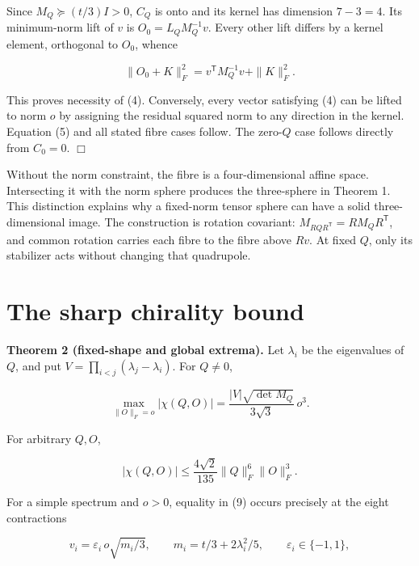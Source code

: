 \documentclass[aps,prd,reprint,onecolumn,11pt,nofootinbib,notitlepage]{revtex4-2}
\begin{document}
Since \(M_Q\succeq(t/3)I>0\), \(C_Q\) is onto and its kernel has dimension \(7-3=4\). Its minimum-norm lift of \(v\) is \(O_0=L_QM_Q^{-1}v\). Every other lift differs by a kernel element, orthogonal to \(O_0\), whence

\begin{equation}
 \|O_0+K\|_F^2=v^{\mathsf T}M_Q^{-1}v+\|K\|_F^2.
 \tag{8}
\end{equation}

This proves necessity of (4). Conversely, every vector satisfying (4) can be lifted to norm \(o\) by assigning the residual squared norm to any direction in the kernel. Equation (5) and all stated fibre cases follow. The zero-\(Q\) case follows directly from \(C_0=0\). \(\Box\)

Without the norm constraint, the fibre is a four-dimensional affine space. Intersecting it with the norm sphere produces the three-sphere in Theorem 1. This distinction explains why a fixed-norm tensor sphere can have a solid three-dimensional image. The construction is rotation covariant: \(M_{RQR^{\mathsf T}}=RM_QR^{\mathsf T}\), and common rotation carries each fibre to the fibre above \(Rv\). At fixed \(Q\), only its stabilizer acts without changing that quadrupole.

\section{The sharp chirality bound}

\textbf{Theorem 2 (fixed-shape and global extrema).} Let \(\lambda_i\) be the eigenvalues of \(Q\), and put \(V=\prod_{i<j}(\lambda_j-\lambda_i)\). For \(Q\ne0\),

\begin{equation}
 \max_{\|O\|_F=o}|\chi(Q,O)|
 =\frac{|V|\sqrt{\det M_Q}}{3\sqrt3}\,o^3.
 \tag{9}
\end{equation}

For arbitrary \(Q,O\),

\begin{equation}
 \boxed{\ |\chi(Q,O)|\le\frac{4\sqrt2}{135}\|Q\|_F^6\|O\|_F^3.\ }
 \tag{10}
\end{equation}

For a simple spectrum and \(o>0\), equality in (9) occurs precisely at the eight contractions

\begin{equation}
 v_i=\varepsilon_i\,o\sqrt{m_i/3},\qquad
 m_i=t/3+2\lambda_i^2/5,\qquad \varepsilon_i\in\{-1,1\},
 \tag{11}
\end{equation}
\end{document}
